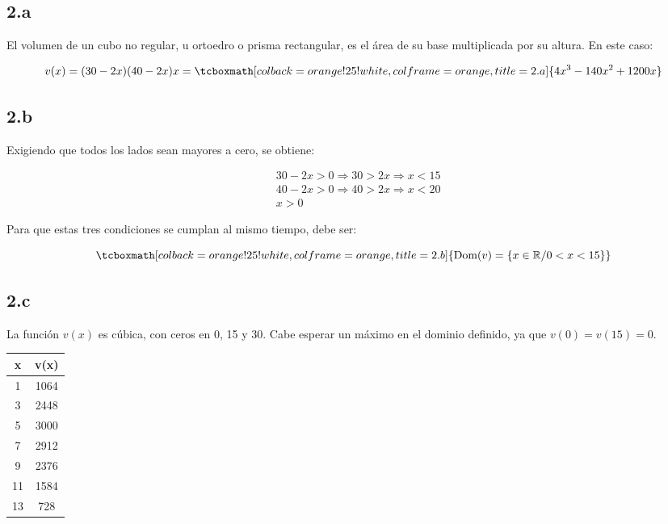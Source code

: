 \documentclass{article}
\newcommand{\hresult}[2]{\tcboxmath[colback=orange!25!white,colframe=orange, title=#1] {#2} }
\begin{document}
\subsection*{2.a}
\label{subsec:2.a}

El volumen de un cubo no regular, u ortoedro o prisma rectangular, es el área de su base multiplicada por su altura. En este caso:

\begin{equation}
v(x) = (30-2x)(40-2x)x = \hresult{2.a}{ 4x^3 - 140x^2 +1200x }
\end{equation}

\subsection*{2.b}
\label{subsec:2.b}

Exigiendo que todos los lados sean mayores a cero, se obtiene:

\begin{subequations}
\begin{align}
& 30 - 2x > 0 \Rightarrow 30 > 2x \Rightarrow x < 15 \\
& 40 - 2x > 0 \Rightarrow 40 > 2x \Rightarrow x < 20 \\
& x > 0
\end{align}
\end{subequations}

Para que estas tres condiciones se cumplan al mismo tiempo, debe ser:

\begin{equation}
\hresult{2.b}{ \mathop{\text{Dom}}(v) = \{ x \in \mathbb{R} / 0 < x < 15 \} }
\end{equation}

\subsection*{2.c}
\label{subsec:2.c}

La función $v(x)$ es cúbica, con ceros en 0, 15 y 30. Cabe esperar un máximo en el dominio definido, ya que $v(0) = v(15) = 0$.

\begin{center}
\begin{tabular}{||c c||} 
 \hline
 x & v(x) \\ [0.5ex] 
 \hline\hline
 1 & 1064 \\ 
 \hline
 3 & 2448 \\
 \hline
 5 & 3000 \\
 \hline
 7 & 2912 \\
 \hline
 9 & 2376 \\
 \hline
 11 & 1584 \\
 \hline
 13 & 728 \\ [1ex] 
 \hline
\end{tabular}
\end{center}
\end{document}
